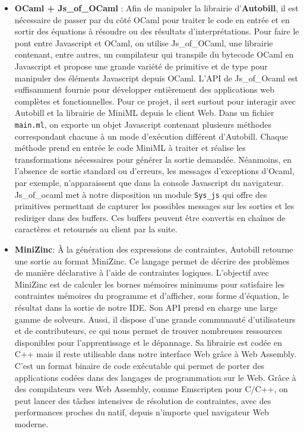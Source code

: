 \documentclass[
  12pt,
]{article}
\begin{document}
\begin{itemize}
\item
  \textbf{OCaml + Js\_of\_OCaml} : Afin de manipuler la librairie
  d'\textbf{Autobill}, il est nécessaire de passer par du côté OCaml
  pour traiter le code en entrée et en sortir des équations à résoudre
  ou des résultats d'interprétations. Pour faire le pont entre
  Javascript et OCaml, on utilise Js\_of\_OCaml, une librairie
  contenant, entre autres, un compilateur qui transpile du bytecode
  OCaml en Javascript et propose une grande variété de primitive et de
  type pour manipuler des éléments Javascript depuis OCaml. L'API de
  Js\_of\_Ocaml est suffisamment fournie pour développer entièrement des
  applications web complètes et fonctionnelles. Pour ce projet, il sert
  surtout pour interagir avec Autobill et la librairie de MiniML depuis
  le client Web. Dans un fichier \texttt{main.ml}, on exporte un objet
  Javascript contenant plusieurs méthodes correspondant chacune à un
  mode d'exécution différent d'Autobill. Chaque méthode prend en entrée
  le code MiniML à traiter et réalise les transformations nécessaires
  pour générer la sortie demandée. Néanmoins, en l'absence de sortie
  standard ou d'erreurs, les messages d'exceptions d'Ocaml, par exemple,
  n'apparaissent que dans la console Javascript du navigateur.
  Js\_of\_ocaml met à notre disposition un module \texttt{Sys\_js} qui
  offre des primitives permettant de capturer les possibles messages sur
  les sorties et les rediriger dans des buffers. Ces buffers peuvent
  être convertis en chaînes de caractères et retournés au client par la
  suite.
\item
  \textbf{MiniZinc}: À la génération des expressions de contraintes,
  Autobill retourne une sortie au format MiniZinc. Ce langage permet de
  décrire des problèmes de manière déclarative à l'aide de contraintes
  logiques. L'objectif avec MiniZinc est de calculer les bornes mémoires
  minimums pour satisfaire les contraintes mémoires du programme et
  d'afficher, sous forme d'équation, le résultat dans la sortie de notre
  IDE. Son API prend en charge une large gamme de solveurs. Aussi, il
  dispose d'une grande communauté d'utilisateurs et de contributeurs, ce
  qui nous permet de trouver nombreuses ressources disponibles pour
  l'apprentissage et le dépannage. Sa librairie est codée en C++ mais il
  reste utilisable dans notre interface Web grâce à Web Assembly. C'est
  un format binaire de code exécutable qui permet de porter des
  applications codées dans des langages de programmation sur le Web.
  Grâce à des compilateurs vers Web Assembly, comme Emscripten pour
  C/C++, on peut lancer des tâches intensives de résolution de
  contraintes, avec des performances proches du natif, depuis n'importe
  quel navigateur Web moderne.
\end{itemize}
\end{document}
